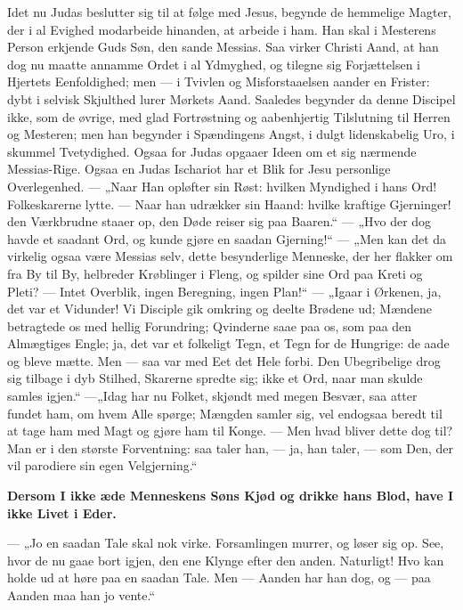 \documentclass[12pt,a4paper]{book}
\begin{document}
Idet nu Judas beslutter sig til at følge med Jesus, begynde de hemmelige Magter, der i
al Evighed modarbeide hinanden, at arbeide i ham. Han skal i Mesterens Person erkjende
Guds Søn, den sande Messias. Saa virker Christi Aand, at han dog nu maatte annamme
Ordet i al Ydmyghed, og tilegne sig Forjættelsen i Hjertets Eenfoldighed; men --- i
Tvivlen og Misforstaaelsen aander en Frister: dybt i selvisk Skjulthed lurer Mørkets
Aand. Saaledes begynder da denne Discipel ikke, som de øvrige, med glad Fortrøstning og
aabenhjertig Tilslutning til Herren og Mesteren; men han begynder i Spændingens Angst, i
dulgt lidenskabelig Uro, i skummel Tvetydighed. Ogsaa for Judas opgaaer Ideen om et sig
nærmende Messias-Rige. Ogsaa en Judas Ischariot har et Blik for Jesu personlige
Overlegenhed. --- „Naar Han opløfter sin Røst: hvilken Myndighed i hans Ord!
Folkeskarerne lytte. --- Naar han udrækker sin Haand: hvilke kraftige Gjerninger! den
Værkbrudne staaer op, den Døde reiser sig paa Baaren.“ --- „Hvo der dog havde et
saadant Ord, og kunde gjøre en saadan Gjerning!“ --- „Men kan det da virkelig ogsaa være
Messias
selv, dette besynderlige Menneske, der her flakker om fra By til By, helbreder
Krøblinger i Fleng, og spilder sine Ord paa Kreti og Pleti? --- Intet Overblik, ingen
Beregning, ingen Plan!“ --- „Igaar i Ørkenen, ja, det var et Vidunder! Vi Disciple gik
omkring og deelte Brødene ud; Mændene betragtede os med hellig Forundring; Qvinderne
saae paa os, som paa den Almægtiges Engle; ja, det var et folkeligt Tegn, et Tegn for de
Hungrige: de aade og bleve mætte. Men --- saa var med Eet det Hele forbi. Den
Ubegribelige drog sig tilbage i dyb Stilhed, Skarerne spredte sig; ikke et Ord, naar man
skulde samles igjen.“ ---„Idag har nu Folket, skjøndt med megen Besvær, saa atter fundet
ham, om hvem Alle spørge; Mængden samler sig, vel endogsaa beredt til at tage ham med
Magt og gjøre ham til Konge. --- Men hvad bliver dette dog til? Man er i den største
Forventning: saa taler han, --- ja, han taler, --- som Den, der vil parodiere sin egen
Velgjerning.“

\textbf{Dersom I ikke æde Menneskens Søns Kjød og drikke hans Blod, have I ikke Livet i
Eder.}

--- „Jo en saadan Tale skal nok virke. Forsamlingen murrer, og løser sig op. See, hvor
de nu gaae bort igjen, den ene Klynge efter den anden. Naturligt! Hvo kan holde ud at
høre paa en saadan Tale. Men --- Aanden har han dog, og --- paa Aanden maa han jo
vente.“
\end{document}
